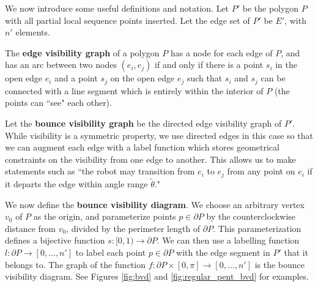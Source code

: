 \documentclass[]{styles/svproc}  %
\begin{document}
We now introduce some useful definitions and notation. Let $P'$ be the polygon $P$ with all partial local sequence points inserted.
Let the edge set of $P'$ be $E'$, with $n'$ elements.

\begin{definition}
The \textbf{edge visibility graph} of a polygon $P$ has a node for each edge of
$P$, and has an arc between two nodes $(e_i, e_j)$ if and only if there is a
point $s_i$ in the open edge $e_i$ and a point $s_j$ on the open edge $e_j$ such
that $s_i$ and $s_j$ can be connected with a line segment which is entirely
within the interior of $P$ (the points can ``see" each other).
\end{definition}

Let the \textbf{bounce visibility graph} be the directed edge visibility graph of
$P'$. While visibility is a symmetric property, we use directed edges in this
case so that we can augment each edge with a label function which stores
geometrical constraints on the visibility from one edge to another. This allows
us to make statements such as ``the robot may transition from $e_i$ to $e_j$
from any point on $e_i$ if it departs the edge within angle range
$\tilde{\theta}$."


We now define the \textbf{bounce visibility diagram}. We choose an arbitrary vertex
$v_0$ of $P$ as the origin, and parameterize points $p \in \partial P$ by the
counterclockwise distance from $v_0$, divided by the perimeter length of
$\partial P$. This parameterization defines a bijective function $s: [0,1) \to \partial P$.
We can then use a labelling function $l: \partial P \to [0, \ldots, n']$ to
label each point $p \in \partial P$ with the edge segment in $P'$ that it
belongs to. The graph of the function $f: \partial P \times [0, \pi] \to [0,
\ldots, n']$ is the bounce visibility diagram. See Figures \ref{fig:bvd} and
\ref{fig:regular_pent_bvd} for examples.
\end{document}
